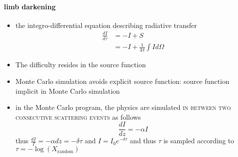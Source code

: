 \documentclass[../main/main.tex]{subfiles}
\begin{document}
\paragraph{limb darkening}
\begin{itemize}
\item the integro-differential equation describing radiative transfer
\begin{equation}
\begin{aligned}
\frac{dI}{d\tau} &= -I +S  \\ 
&= -I  + \frac{1}{4\pi} \int I d\Omega
\end{aligned}
\end{equation}

\item The difficulty resides in the source function

\item Monte Carlo simulation avoids explicit source function: source function implicit in Monte Carlo simulation

\item in the Monte Carlo program, the physics are simulated \textsc{in between two consecutive scattering events} as follows
\begin{equation}
\frac{dI}{dz} = -\alpha I 
\end{equation}
thus $\frac{dI}{I} = -\alpha dz = -\delta \tau$ and $I = I_0 e^{-\delta \tau}$ and thus $\tau$ is sampled according to $\tau = - \log(X_{\text{random}})$
\end{itemize}
\end{document}
